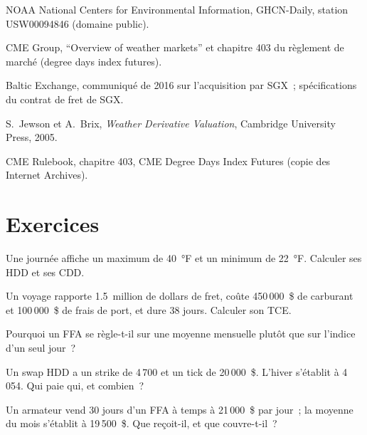 \begin{omsources}
\item NOAA National Centers for Environmental Information, GHCN-Daily, station USW00094846 (domaine public).
\item CME Group, ``Overview of weather markets'' et chapitre 403 du règlement de marché (degree days index futures).
\item Baltic Exchange, communiqué de 2016 sur l'acquisition par SGX~; spécifications du contrat de fret de SGX.
\item S.~Jewson et A.~Brix, \emph{Weather Derivative Valuation}, Cambridge University Press, 2005.
\item CME Rulebook, chapitre 403, CME Degree Days Index Futures (copie des Internet Archives).
\end{omsources}

\section{Exercices}

\begin{exercise}[$\star$]\label{exo:m3:freight-weather-and-other-corners:1}
Une journée affiche un maximum de 40~°F et un minimum de 22~°F. Calculer ses HDD et ses CDD.
\end{exercise}

\begin{exercise}[$\star$]\label{exo:m3:freight-weather-and-other-corners:2}
Un voyage rapporte 1.5~million de dollars de fret, coûte 450\,000~\$ de carburant et 100\,000~\$ de frais de port, et dure
38 jours. Calculer son TCE.
\end{exercise}

\begin{exercise}[$\star$]\label{exo:m3:freight-weather-and-other-corners:3}
Pourquoi un FFA se règle-t-il sur une moyenne mensuelle plutôt que sur l'indice d'un seul jour~?
\end{exercise}

\begin{exercise}[$\star\star$]\label{exo:m3:freight-weather-and-other-corners:4}
Un swap HDD a un strike de 4\,700 et un tick de 20\,000~\$. L'hiver s'établit à 4\,054. Qui paie qui,
et combien~?
\end{exercise}

\begin{exercise}[$\star\star$]\label{exo:m3:freight-weather-and-other-corners:5}
Un armateur vend 30 jours d'un FFA à temps à 21\,000~\$ par jour~; la moyenne du mois s'établit à 19\,500~\$. Que
reçoit-il, et que couvre-t-il~?
\end{exercise}

